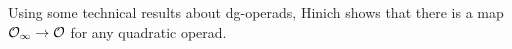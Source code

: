 \documentclass[TFM.tex]{subfiles}
\begin{document}
%
%
%
%
%
%
%
Using some technical results about dg-operads, Hinich shows that there is a map ${\mathcal O}_\infty\to {\mathcal O}$ for any quadratic operad. 
\end{document}
